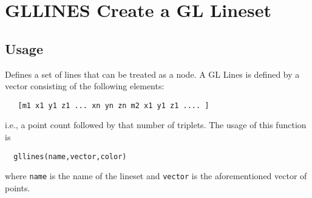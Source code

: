 \section{GLLINES Create a GL Lineset}

\subsection{Usage}

Defines a set of lines that can be treated as a node.
A GL Lines is defined by a vector consisting of the
following elements:
\begin{verbatim}
   [m1 x1 y1 z1 ... xn yn zn m2 x1 y1 z1 .... ]
\end{verbatim}
i.e., a point count followed by that number of triplets.
The usage of this function is 
\begin{verbatim}
  gllines(name,vector,color)
\end{verbatim}
where \verb|name| is the name of the lineset and \verb|vector|
is the aforementioned vector of points.
